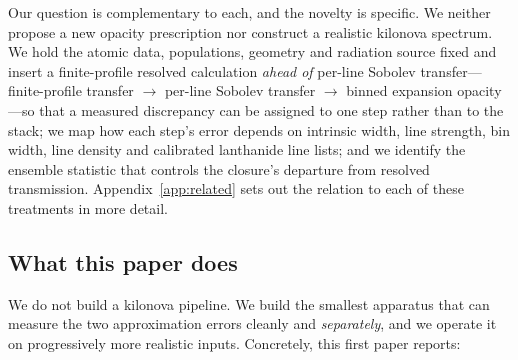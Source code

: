 \documentclass[fleqn,usenatbib]{mnras}
\begin{document}
Our question is complementary to each, and the novelty is specific. We
neither propose a new opacity prescription nor construct a realistic kilonova
spectrum. We hold the atomic data, populations, geometry and radiation source
fixed and insert a finite-profile resolved calculation \emph{ahead of}
per-line Sobolev transfer---finite-profile transfer $\rightarrow$ per-line
Sobolev transfer $\rightarrow$ binned expansion opacity---so that a measured
discrepancy can be assigned to one step rather than to the stack; we map how
each step's error depends on intrinsic width, line strength, bin width, line
density and calibrated lanthanide line lists; and we identify the ensemble
statistic that controls the closure's departure from resolved transmission.
Appendix~\ref{app:related} sets out the relation to each of these treatments
in more detail.

\subsection{What this paper does}

We do not build a kilonova pipeline. We build the smallest apparatus that can
measure the two approximation errors cleanly and \emph{separately}, and we
operate it on progressively more realistic inputs. Concretely, this first
paper reports:
\end{document}
